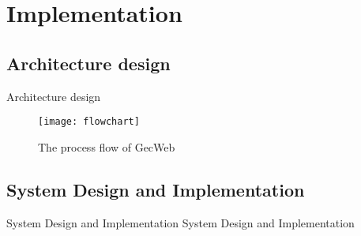 \section{Implementation}

\subsection{Architecture design}

\begin{frame}{Architecture design}
  \begin{figure}
    \begin{center}
      \texttt{[image: flowchart]}
    \end{center}
    \caption{The process flow of GecWeb}\label{fig:flowchart}
  \end{figure}
\end{frame}

\subsection{System Design and Implementation}

\begin{frame}{System Design and Implementation}
  System Design and Implementation
\end{frame}
